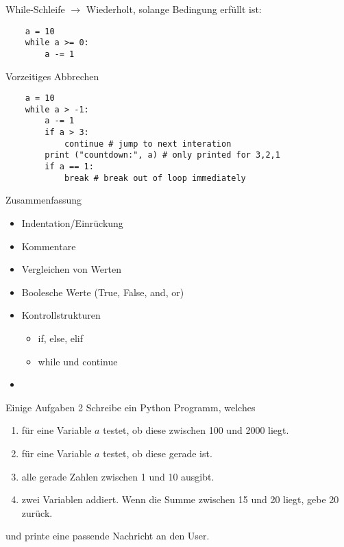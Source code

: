 \begin{frame}[fragile]{While-Schleife}
    $\rightarrow$ Wiederholt, solange Bedingung erfüllt ist:
    \begin{lstlisting}
    a = 10
    while a >= 0:
        a -= 1
    \end{lstlisting}
\end{frame}

\begin{frame}[fragile]{Vorzeitiges Abbrechen} 
    \begin{lstlisting}
    a = 10
    while a > -1:
        a -= 1
        if a > 3:
            continue # jump to next interation
        print ("countdown:", a) # only printed for 3,2,1
        if a == 1:
            break # break out of loop immediately
    \end{lstlisting}
\end{frame}

\begin{frame}{Zusammenfassung}
	\begin{itemize}
		\item Indentation/Einrückung
		\item Kommentare
		\item Vergleichen von Werten
		\item Boolesche Werte (True, False, and, or)
		\item Kontrollstrukturen
		\begin{itemize}
			\item if, else, elif
			\item while und continue
		\end{itemize}
		\item 
	\end{itemize}
\end{frame}

\begin{frame}{Einige Aufgaben 2}
	Schreibe ein Python Programm, welches
	\begin{enumerate}
		\item für eine Variable $a$ testet, ob diese zwischen 100 und 2000 liegt.
		\item für eine Variable $a$ testet, ob diese gerade ist.
		\item alle gerade Zahlen zwischen 1 und 10 ausgibt.
		\item zwei Variablen addiert. Wenn die Summe zwischen 15 und 20 liegt, gebe 20 zurück.
	\end{enumerate}
	und printe eine passende Nachricht an den User.
\end{frame}

